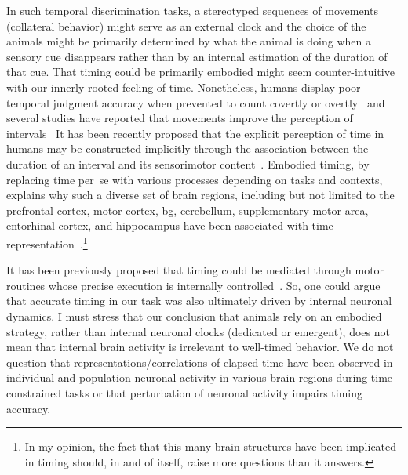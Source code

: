 In such temporal discrimination tasks, a stereotyped sequences of movements (collateral behavior) might serve as an external clock and the choice of the animals might be primarily determined by what the animal is doing when a sensory cue disappears rather than by an internal estimation of the duration of that cue.
That timing could be primarily embodied might seem counter-intuitive with our innerly-rooted feeling of time.
Nonetheless, humans display poor temporal judgment accuracy when prevented to count covertly or overtly~\cite{Rattat2012} and several studies have reported that movements improve the perception of intervals~\cite{Su2012,Manning2013,Wiener2019eNeuro}
It has been recently proposed that the explicit perception of time in humans may be constructed implicitly through the association between the duration of an interval and its sensorimotor content~\cite{Coull2018}.
Embodied timing, by replacing time per~se with various processes depending on tasks and contexts, explains why such a diverse set of brain regions, including but not limited to the prefrontal cortex, motor cortex, \gls{bg}, cerebellum, supplementary motor area, entorhinal cortex, and hippocampus have been associated with time representation~\cite{Pouthas2005, Kraus2013Neuron, Bakhurin2017JNeuro, Morillon2017PNAS, Gu2018NeuroLearnMem, Mello2015, Schubotz2000, Heys2018NN,JazayeriNN2018}.\footnote{In my opinion, the fact that this many brain structures have been implicated in timing should, in and of itself, raise more questions than it answers.}
\par
It has been previously proposed that timing could be mediated through motor routines whose precise execution is internally controlled~\cite{Killeen1988,Dragoi2003, Staddon1999}.
So, one could argue that accurate timing in our task was also ultimately driven by internal neuronal dynamics.
I must stress that our conclusion that animals rely on an embodied strategy, rather than internal neuronal clocks (dedicated or emergent), does not mean that internal brain activity is irrelevant to well-timed behavior.
We do not question that representations/correlations of elapsed time have been observed in individual and population neuronal activity in various brain regions during time-constrained tasks or that perturbation of neuronal activity impairs timing accuracy.
